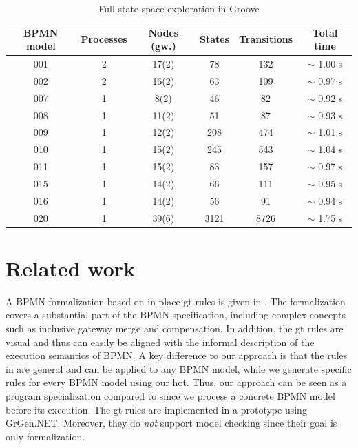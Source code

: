 \documentclass[runningheads]{llncs}
\begin{document}
\begin{table}[ht]
\centering

\begin{tabular}{| c | c | c || c | c | c |}
 \hline
 BPMN model & Processes & Nodes (gw.) & States & Transitions & Total time \\
 \hline\hline
 001 & 2 & 17(2) & 78 & 132 & $\sim$ 1.00 s \\
 \hline
 002 & 2 & 16(2) & 63 & 109 & $\sim$ 0.97 s \\
 \hline
 007 & 1 & 8(2) & 46 & 82 & $\sim$ 0.92 s \\
 \hline
 008 & 1 & 11(2) & 51 & 87 & $\sim$ 0.93 s \\
 \hline
 009 & 1 & 12(2) & 208 & 474 & $\sim$ 1.01 s \\
 \hline
 010 & 1 & 15(2) & 245 & 543 & $\sim$ 1.04 s \\
 \hline
 011 & 1 & 15(2) & 83 & 157 & $\sim$ 0.97 s \\
 \hline
 015 & 1 & 14(2) & 66 & 111 & $\sim$ 0.95 s \\
 \hline
 016 & 1 & 14(2) & 56 & 91 & $\sim$ 0.94 s \\
 \hline
 020 & 1 & 39(6) & 3121 & 8726 & $\sim$ 1.75 s \\
 \hline
\end{tabular}
\caption[Full state space exploration in Groove]{Full state space exploration in Groove}
\label{table:grooveRuntime}
\end{table}


\section{Related work} \label{sec:relatedWork}
A BPMN formalization based on in-place \gls*{gt} rules is given in \cite{vangorpVisualTokenbasedFormalization2013}.
The formalization covers a substantial part of the BPMN specification, including complex concepts such as inclusive gateway merge and compensation.
In addition, the \gls*{gt} rules are visual and thus can easily be aligned with the informal description of the execution semantics of BPMN.
A key difference to our approach is that the rules in \cite{vangorpVisualTokenbasedFormalization2013} are general and can be applied to any BPMN model, while we generate specific rules for every BPMN model using our \gls*{hot}.
Thus, our approach can be seen as a program specialization compared to \cite{vangorpVisualTokenbasedFormalization2013} since we process a concrete BPMN model before its execution.
The \gls*{gt} rules are implemented in a prototype using GrGen.NET.
Moreover, they do \textit{not} support model checking since their goal is only formalization.
\end{document}
